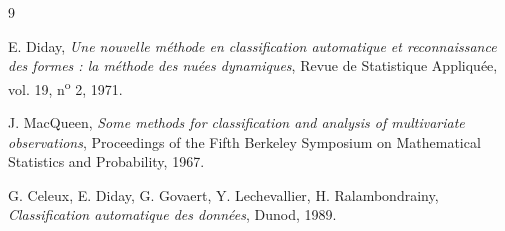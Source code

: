 \documentclass[a4paper, 11pt]{article}
\begin{document}
	
	\newpage
	\begin{thebibliography}{9}
		
		E. Diday,
		\textit{Une nouvelle méthode en classification automatique et
			reconnaissance des formes : la méthode des nuées dynamiques},
		Revue de Statistique Appliquée, vol. 19, n\textsuperscript{o} 2,
		1971.
		
		J. MacQueen,
		\textit{Some methods for classification and analysis of multivariate
			observations},
		Proceedings of the Fifth Berkeley Symposium on Mathematical
		Statistics and Probability, 1967.
		
		G. Celeux, E. Diday, G. Govaert, Y. Lechevallier,
		H. Ralambondrainy,
		\textit{Classification automatique des données},
		Dunod, 1989.
		
	\end{thebibliography}
	
\end{document}
